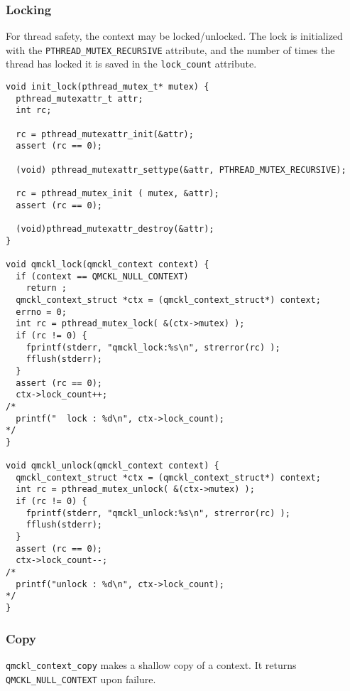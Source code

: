 \subsubsection{Locking}
\label{sec:orge3ea316}

For thread safety, the context may be locked/unlocked. The lock is
initialized with the \texttt{PTHREAD\_MUTEX\_RECURSIVE} attribute, and the
number of times the thread has locked it is saved in the
\texttt{lock\_count} attribute.

\begin{verbatim}
void init_lock(pthread_mutex_t* mutex) {
  pthread_mutexattr_t attr;
  int rc;
  
  rc = pthread_mutexattr_init(&attr); 
  assert (rc == 0);
  
  (void) pthread_mutexattr_settype(&attr, PTHREAD_MUTEX_RECURSIVE);
  
  rc = pthread_mutex_init ( mutex, &attr);
  assert (rc == 0);
  
  (void)pthread_mutexattr_destroy(&attr);
}

void qmckl_lock(qmckl_context context) {
  if (context == QMCKL_NULL_CONTEXT)
    return ;
  qmckl_context_struct *ctx = (qmckl_context_struct*) context;
  errno = 0;
  int rc = pthread_mutex_lock( &(ctx->mutex) );
  if (rc != 0) {
    fprintf(stderr, "qmckl_lock:%s\n", strerror(rc) );
    fflush(stderr);
  }
  assert (rc == 0);
  ctx->lock_count++;
/*
  printf("  lock : %d\n", ctx->lock_count);
*/
}

void qmckl_unlock(qmckl_context context) {
  qmckl_context_struct *ctx = (qmckl_context_struct*) context;
  int rc = pthread_mutex_unlock( &(ctx->mutex) );
  if (rc != 0) {
    fprintf(stderr, "qmckl_unlock:%s\n", strerror(rc) );
    fflush(stderr);
  }
  assert (rc == 0);
  ctx->lock_count--;
/*
  printf("unlock : %d\n", ctx->lock_count);
*/
}
\end{verbatim}

\subsubsection{Copy}
\label{sec:org38bfb02}

\texttt{qmckl\_context\_copy} makes a shallow copy of a context. It returns
\texttt{QMCKL\_NULL\_CONTEXT} upon failure.

